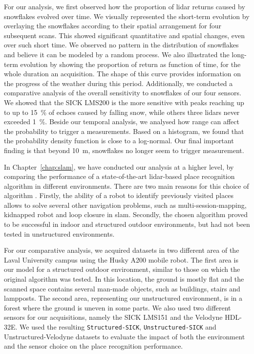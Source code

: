 For our analysis, we first observed how the proportion of \gls*{lidar} returns caused by snowflakes evolved over time. We visually represented the short-term evolution by overlaying the snowflakes according to their spatial arrangement for four subsequent scans. This showed significant quantitative and spatial changes, even over such short time. We observed no pattern in the distribution of snowflakes and believe it can be modeled by a random process. We also illustrated the long-term evolution by showing the proportion of return as function of time, for the whole duration an acquisition. The shape of this curve provides information on the progress of the weather during this period. Additionally, we conducted a comparative analysis of the overall sensitivity to snowflakes of our four sensors. We showed that the SICK LMS200 is the more sensitive with peaks reaching up to up to \SI{15}{\percent} of echoes caused by falling snow, while others three \gls*{lidar}s never exceeded \SI{1}{\percent}. Beside our temporal analysis, we analysed how range can affect the probability to trigger a measurements. Based on a histogram, we found that the probability density function is close to a log-normal. Our final important finding is that beyond \SI{10}{\meter}, snowflakes no longer seem to trigger measurement.

In Chapter~\ref{chap:slam}, we have conducted our analysis at a higher level, by comparing the performance of a state-of-the-art \gls*{lidar}-based place recognition algorithm in different environments. There are two main reasons for this choice of algorithm . Firstly, the ability of a robot to identify previously visited places allows to solve several other navigation problems, such as multi-session-mapping, kidnapped robot and loop closure in \gls*{slam}. Secondly, the chosen algorithm proved to be successful in indoor and structured outdoor environments, but had not been tested in unstructured environments.

For our comparative analysis, we acquired datasets in two different area of the Laval University campus using the Husky A200 mobile robot. The first area is our model for a structured outdoor environment, similar to those on which the original algorithm was tested. In this location, the ground is mostly flat and the scanned space contains several man-made objects, such as buildings, stairs and lampposts. The second area, representing our unstructured environment, is in a forest where the ground is uneven in some parts. We also used two different sensors for our acquisitions, namely the SICK LMS151 and the Velodyne HDL-32E. We used the resulting \texttt{Structured-SICK}, \texttt{Unstructured-SICK} and Unstructured-Velodyne datasets to evaluate the impact of both the environment and the sensor choice on the place recognition performance.

